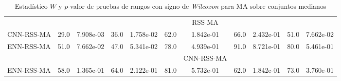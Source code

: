 \begin{table}[]
\begin{adjustbox}{max width =\textwidth}
\begin{tabular}{l c c c c c c c c c c}
\hline

 & & & & & & RSS-MA & & & & \\
CNN-RSS-MA & 29.0 & 7.908e-03 & 36.0 & 1.758e-02 & 62.0 & 1.842e-01 & 66.0 & 2.432e-01 & 51.0 & 7.662e-02 \\  
ENN-RSS-MA & 51.0 & 7.662e-02 & 47.0 & 5.341e-02 & 78.0 & 4.939e-01 & 91.0 & 8.721e-01 & 80.0 & 5.461e-01 \\ 

\hline

 & & & & & & CNN-RSS-MA & & & & \\ 
ENN-RSS-MA & 58.0 & 1.365e-01 & 64.0 & 2.122e-01 & 81.0 & 5.732e-01 & 62.0 & 1.842e-01 & 73.0 & 3.760e-01 \\ 

\hline

\end{tabular}
\end{adjustbox}
\caption[Pruebas de \emph{Wilcoxon} entre MA y variaciones para conjuntos medianos]{Estadístico $W$ y $p$-valor de pruebas de rangos con signo de \emph{Wilcoxon} para MA sobre conjuntos medianos}
\label{wilcox-MA-med}
\end{table}




